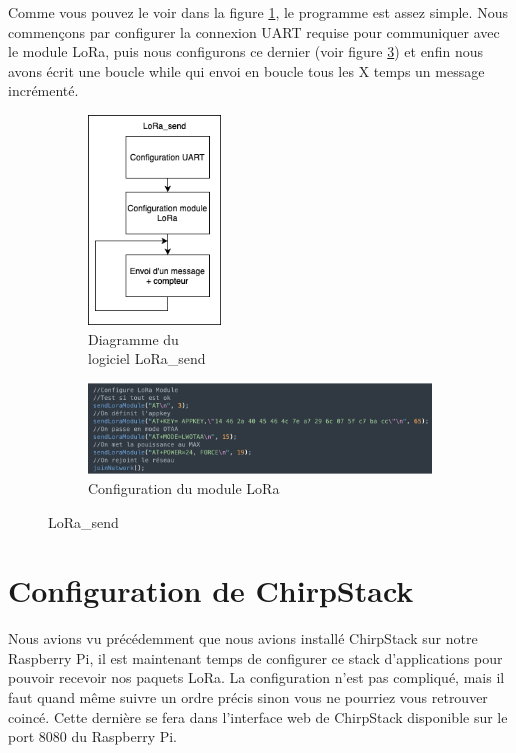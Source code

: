 \documentclass{article}
\begin{document}
		Comme vous pouvez le voir dans la figure \ref{fig:lorasend}, le programme est assez simple. Nous commençons par configurer la connexion UART requise pour communiquer avec le module LoRa, puis nous configurons ce dernier (voir figure \ref{fig:atlorasend}) et enfin nous avons écrit une boucle while qui envoi en boucle tous les X temps un message incrémenté.
		\begin{figure}[H]
			\centering
			\begin{subfigure}{0.20\textwidth}
				\centering
				\includegraphics[height=15em]{LoRa_send.drawio}
				\caption{Diagramme du\\ logiciel LoRa\_send}
				\label{fig:lorasend}
			\end{subfigure}
			\begin{subfigure}{0.70\textwidth}
				\centering
				\includegraphics[width=1\linewidth]{atLorasend}
				\caption{Configuration du module LoRa}
				\label{fig:atlorasend}
			\end{subfigure}
			\caption{LoRa\_send}
		\end{figure}
	
	\section{Configuration de ChirpStack}
		Nous avions vu précédemment que nous avions installé ChirpStack sur notre Raspberry Pi, il est maintenant temps de configurer ce stack d'applications pour pouvoir recevoir nos paquets LoRa.
		La configuration n'est pas compliqué, mais il faut quand même suivre un ordre précis sinon vous ne pourriez vous retrouver coincé. Cette dernière se fera dans l'interface web de ChirpStack disponible sur le port 8080 du Raspberry Pi.
		
\end{document}
